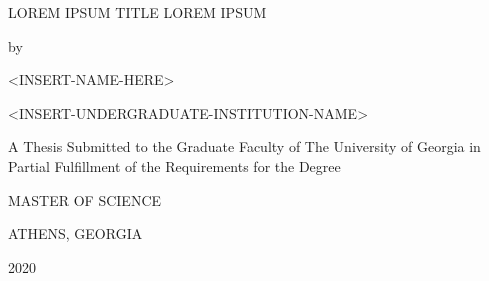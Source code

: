 \thispagestyle{empty}

\begin{center}
    LOREM IPSUM TITLE LOREM IPSUM
    
    \vspace*{2\baselineskip}
    by

    \vspace*{2\baselineskip}
    <INSERT-NAME-HERE>
    
    <INSERT-UNDERGRADUATE-INSTITUTION-NAME>
    \vspace*{4\baselineskip}

    A Thesis Submitted to the Graduate Faculty of The University of Georgia
    in Partial Fulfillment of the Requirements for the Degree
    \vspace*{3\baselineskip}

    MASTER OF SCIENCE
    \vspace*{3\baselineskip}

    ATHENS, GEORGIA
    
    2020
\end{center}

\newpage
